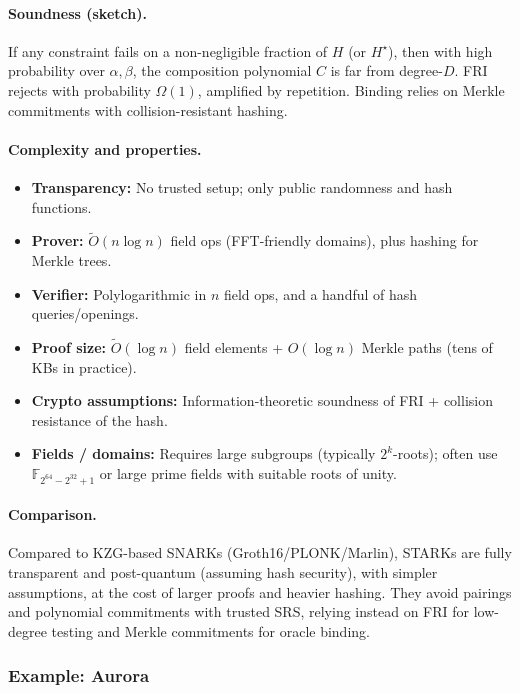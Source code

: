 \paragraph{Soundness (sketch).}
If any constraint fails on a non-negligible fraction of $H$ (or $H^\star$),
then with high probability over $\alpha,\beta$, the composition polynomial $C$
is far from degree-$D$. FRI rejects with probability $\Omega(1)$, amplified by
repetition. Binding relies on Merkle commitments with collision-resistant hashing.

\paragraph{Complexity and properties.}
\begin{itemize}
  \item \textbf{Transparency:} No trusted setup; only public randomness and hash functions.
  \item \textbf{Prover:} $\tilde{O}(n\log n)$ field ops (FFT-friendly domains), plus hashing for Merkle trees.
  \item \textbf{Verifier:} Polylogarithmic in $n$ field ops, and a handful of hash queries/openings.
  \item \textbf{Proof size:} $\tilde{O}(\log n)$ field elements + $O(\log n)$ Merkle paths (tens of KBs in practice).
  \item \textbf{Crypto assumptions:} Information-theoretic soundness of FRI + collision resistance of the hash.
  \item \textbf{Fields / domains:} Requires large subgroups (typically $2^k$-roots); often use $\mathbb{F}_{2^{64}-2^{32}+1}$ or large prime fields with suitable roots of unity.
\end{itemize}

\paragraph{Comparison.}
Compared to KZG-based SNARKs (Groth16/PLONK/Marlin), STARKs are fully transparent and post-quantum (assuming hash security), with simpler assumptions, at the cost of larger proofs and heavier hashing. They avoid pairings and polynomial commitments with trusted SRS, relying instead on FRI for low-degree testing and Merkle commitments for oracle binding.

\subsubsection*{Example: Aurora}


